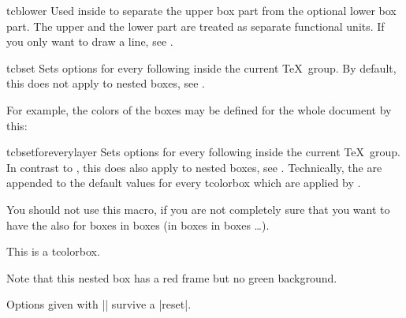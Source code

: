 \begin{docCommand}{tcblower}{}
  Used inside  to separate the upper box part from
  the optional lower box part. The upper and the lower part are treated
  as separate functional units. If you only want to draw a line, see
  .
\end{docCommand}


\clearpage
\begin{docCommand}{tcbset}{}
  Sets options for every following  inside the current \TeX\ group.
  By default, this does not apply to nested boxes, see .\par
  For example, the colors of the boxes may be defined for the whole document by this:
\begin{dispListing}
\end{dispListing}
\end{docCommand}


\begin{docCommand}{tcbsetforeverylayer}{}
  Sets options for every following  inside the current \TeX\ group.
  In contrast to , this does also
  apply to nested boxes, see .
  Technically, the  are appended to the default values for every
  tcolorbox which are applied by .\par
  You should not use this macro, if you are not completely sure that you
  want to have the  also for boxes in boxes (in boxes in boxes \ldots).
\begin{dispExample}

\begin{tcolorbox}[title=All options for this box]
  This is a tcolorbox.\par\medskip
  \begin{tcolorbox}[title=Nested box]
    Note that this nested box has a red frame but no green background.
  \end{tcolorbox}
\end{tcolorbox}
\bigskip

\begin{tcolorbox}[reset]
  Options given with |\tcbsetforeverylayer| survive a |reset|.
\end{tcolorbox}
\end{dispExample}
\end{docCommand}


